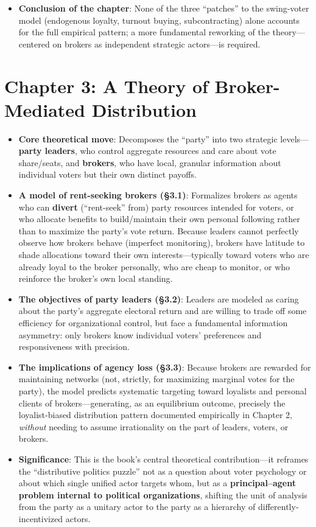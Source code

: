 \documentclass[12pt]{article}
\begin{document}
\begin{itemize}[leftmargin=*, itemsep=4pt]
    \item \textbf{Conclusion of the chapter}: None of the three ``patches'' to the swing-voter model (endogenous loyalty, turnout buying, subcontracting) alone accounts for the full empirical pattern; a more fundamental reworking of the theory---centered on brokers as independent strategic actors---is required.
\end{itemize}

\section{Chapter 3: A Theory of Broker-Mediated Distribution}

\begin{itemize}[leftmargin=*, itemsep=4pt]
    \item \textbf{Core theoretical move}: Decomposes the ``party'' into two strategic levels---\textbf{party leaders}, who control aggregate resources and care about vote share/seats, and \textbf{brokers}, who have local, granular information about individual voters but their own distinct payoffs.
    \item \textbf{A model of rent-seeking brokers (\S3.1)}: Formalizes brokers as agents who can \textbf{divert} (``rent-seek'' from) party resources intended for voters, or who allocate benefits to build/maintain their own personal following rather than to maximize the party's vote return. Because leaders cannot perfectly observe how brokers behave (imperfect monitoring), brokers have latitude to shade allocations toward their own interests---typically toward voters who are already loyal to the broker personally, who are cheap to monitor, or who reinforce the broker's own local standing.
    \item \textbf{The objectives of party leaders (\S3.2)}: Leaders are modeled as caring about the party's aggregate electoral return and are willing to trade off some efficiency for organizational control, but face a fundamental information asymmetry: only brokers know individual voters' preferences and responsiveness with precision.
    \item \textbf{The implications of agency loss (\S3.3)}: Because brokers are rewarded for maintaining networks (not, strictly, for maximizing marginal votes for the party), the model predicts systematic targeting toward loyalists and personal clients of brokers---generating, as an equilibrium outcome, precisely the loyalist-biased distribution pattern documented empirically in Chapter 2, \emph{without} needing to assume irrationality on the part of leaders, voters, or brokers.
    \item \textbf{Significance}: This is the book's central theoretical contribution---it reframes the ``distributive politics puzzle'' not as a question about voter psychology or about which single unified actor targets whom, but as a \textbf{principal--agent problem internal to political organizations}, shifting the unit of analysis from the party as a unitary actor to the party as a hierarchy of differently-incentivized actors.
\end{itemize}
\end{document}
